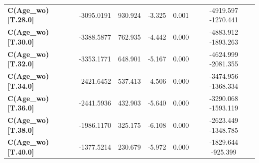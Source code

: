 \begin{subappendices}
\begin{table}[H]
{\begin{tabular}{lccccc}
\textbf{C(Age_wo)[T.28.0]}                                           &   -3095.0191  &      930.924     &    -3.325  &         0.001        &     -4919.597 -1270.441       \\
\textbf{C(Age_wo)[T.30.0]}                                           &   -3388.5877  &      762.935     &    -4.442  &         0.000        &     -4883.912 -1893.263       \\
\textbf{C(Age_wo)[T.32.0]}                                           &   -3353.1771  &      648.901     &    -5.167  &         0.000        &     -4624.999 -2081.355       \\
\textbf{C(Age_wo)[T.34.0]}                                           &   -2421.6452  &      537.413     &    -4.506  &         0.000        &     -3474.956 -1368.334       \\
\textbf{C(Age_wo)[T.36.0]}                                           &   -2441.5936  &      432.903     &    -5.640  &         0.000        &     -3290.068 -1593.119       \\
\textbf{C(Age_wo)[T.38.0]}                                           &   -1986.1170  &      325.175     &    -6.108  &         0.000        &     -2623.449 -1348.785       \\
\textbf{C(Age_wo)[T.40.0]}                                           &   -1377.5214  &      230.679     &    -5.972  &         0.000        &     -1829.644  -925.399       \\

\end{tabular}}
\end{table}
\end{subappendices}
